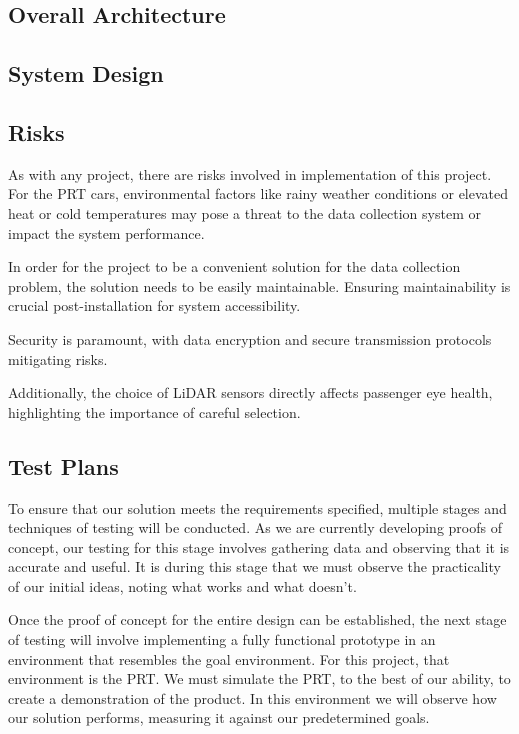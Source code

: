 \subsection{Overall Architecture}


\subsection{System Design}


\subsection{Risks}
As with any project, there are risks involved in implementation of this project. 
For the PRT cars, environmental factors like rainy weather conditions or elevated heat or cold temperatures may pose a threat to the data collection system or impact the system performance.

In order for the project to be a convenient solution for the data collection problem, the solution needs to be easily maintainable. 
Ensuring maintainability is crucial post-installation for system accessibility. 

Security is paramount, with data encryption and secure transmission protocols mitigating risks. 

Additionally, the choice of LiDAR sensors directly affects passenger eye health, highlighting the importance of careful selection.


\subsection{Test Plans}
To ensure that our solution meets the requirements specified, multiple stages and techniques of testing will be conducted. 
As we are currently developing proofs of concept, our testing for this stage involves gathering data and observing that it is accurate and useful. 
It is during this stage that we must observe the practicality of our initial ideas, noting what works and what doesn’t.

Once the proof of concept for the entire design can be established, the next stage of testing will involve implementing a fully functional prototype in an environment that resembles the goal environment. 
For this project, that environment is the PRT. 
We must simulate the PRT, to the best of our ability, to create a demonstration of the product. 
In this environment we will observe how our solution performs, measuring it against our predetermined goals. 

